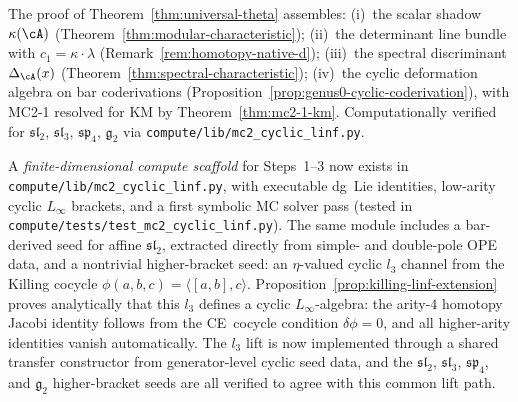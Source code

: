 \begin{remark}\label{rem:mc2-status}
The proof of Theorem~\ref{thm:universal-theta} assembles:
(i)~the scalar shadow $\kappa(\cA)$ (Theorem~\ref{thm:modular-characteristic});
(ii)~the determinant line bundle with $c_1=\kappa\cdot\lambda$
(Remark~\ref{rem:homotopy-native-d});
(iii)~the spectral discriminant $\Delta_{\cA}(x)$
(Theorem~\ref{thm:spectral-characteristic});
(iv)~the cyclic deformation algebra on bar coderivations
(Proposition~\ref{prop:genus0-cyclic-coderivation}), with
MC2-1 resolved for KM by Theorem~\ref{thm:mc2-1-km}.
Computationally verified for $\mathfrak{sl}_2$, $\mathfrak{sl}_3$,
$\mathfrak{sp}_4$, $\mathfrak{g}_2$ via
\texttt{compute/lib/mc2\_cyclic\_linf.py}.
\end{remark}


\iffalse  %
\item A \emph{finite-dimensional compute scaffold} for Steps~1--3 now exists in
  \nolinkurl{compute/lib/mc2_cyclic_linf.py}, with executable dg~Lie identities,
  low-arity cyclic $L_\infty$ brackets, and a first symbolic MC solver pass
  \textup{(}tested in
  \nolinkurl{compute/tests/test_mc2_cyclic_linf.py}\textup{)}.
  The same module includes a bar-derived seed for affine
  $\mathfrak{sl}_2$, extracted directly from simple- and double-pole OPE data,
  and a nontrivial higher-bracket seed:
  an $\eta$-valued cyclic $l_3$ channel from the Killing cocycle
  $\phi(a,b,c)=\langle [a,b],c\rangle$.
  Proposition~\ref{prop:killing-linf-extension} proves analytically
  that this $l_3$ defines a cyclic $L_\infty$-algebra: the
  arity-$4$ homotopy Jacobi identity follows from the
  CE~cocycle condition $\delta\phi=0$, and all
  higher-arity identities vanish automatically.
  The $l_3$ lift is now implemented through a shared transfer constructor
  from generator-level cyclic seed data, and the $\mathfrak{sl}_2$,
  $\mathfrak{sl}_3$, $\mathfrak{sp}_4$, and $\mathfrak{g}_2$
  higher-bracket seeds are all
  verified to agree with this common lift path.

